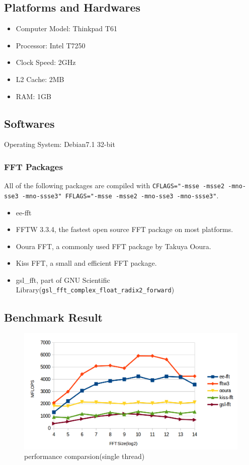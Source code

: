 \documentclass[a4paper]{report}
\begin{document}
\subsection{Platforms and Hardwares} \indent

\begin{itemize}
	\item Computer Model: Thinkpad T61
	\item Processor: Intel T7250
	\item Clock Speed: 2GHz
	\item L2 Cache: 2MB
	\item RAM: 1GB
\end{itemize}

\subsection{Softwares} \indent

	Operating System: Debian7.1 32-bit

\subsubsection{FFT Packages} \indent

	All of the following packages are compiled with \texttt{CFLAGS="-msse -msse2 -mno-sse3 -mno-ssse3" FFLAGS="-msse -msse2 -mno-sse3 -mno-ssse3"}.

\begin{itemize}
	\item ee-fft
	\item FFTW 3.3.4, the fastest open source FFT package on most platforms\cite{fftw}.
	\item Ooura FFT, a commonly used FFT package by Takuya Ooura.
	\item Kiss FFT, a small and efficient FFT package.
	\item gsl\_fft, part of GNU Scientific Library(\texttt{gsl\_fft\_complex\_float\_radix2\_forward})
\end{itemize}

\subsection{Benchmark Result} \indent

\begin{figure}[htp]
\centering
\includegraphics[scale=0.4]{bench.png}
\caption{performance comparsion(single thread)}
\end{figure}
\end{document}
